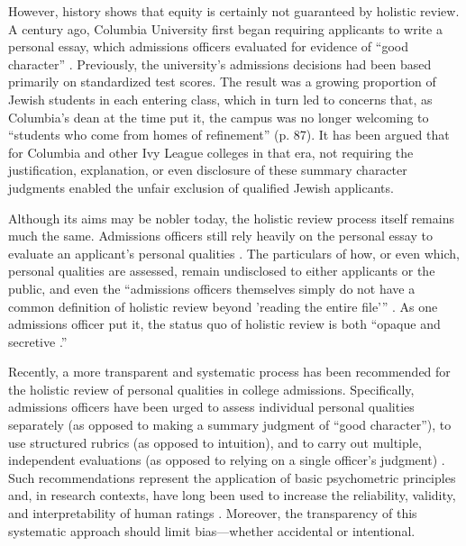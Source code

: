 \documentclass[11pt]{report}
\begin{document}
\begin{mainf}
However, history shows that equity is certainly not guaranteed by holistic review. A century ago, Columbia University first began requiring applicants to write a personal essay, which admissions officers evaluated for evidence of “good character” 
 \cite{karabel_chosen_2005}. Previously, the university’s admissions decisions had been based primarily on standardized test scores. The result was a growing proportion of Jewish students in each entering class, which in turn led to concerns that, as Columbia’s dean at the time put it, the campus was no longer welcoming to “students who come from homes of refinement” (p. 87). It has been argued that for Columbia and other Ivy League colleges in that era, not requiring the justification, explanation, or even disclosure of these summary character judgments enabled the unfair exclusion of qualified Jewish applicants.
 

Although its aims may be nobler today, the holistic review process itself remains much the same. Admissions officers still rely heavily on the personal essay to evaluate an applicant’s personal qualities \cite{national_research_council_assessing_2011}. The particulars of how, or even which, personal qualities are assessed, remain undisclosed to either applicants or the public, and even the “admissions officers themselves simply do not have a common definition of holistic review beyond 'reading the entire file'” \cite{bastedo_what_2018}. As one admissions officer put it, the status quo of holistic review is both ``opaque and secretive \cite{starkman_confessions_2013}.''

Recently, a more transparent and systematic process has been recommended for the holistic review of personal qualities in college admissions. Specifically, admissions officers have been urged to assess individual personal qualities separately (as opposed to making a summary judgment of “good character”), to use structured rubrics (as opposed to intuition), and to carry out multiple, independent evaluations (as opposed to relying on a single officer’s judgment) \cite{coleman_understanding_2018,anderson_character_2020}. Such recommendations represent the application of basic psychometric principles and, in research contexts, have long been used to increase the reliability, validity, and interpretability of human ratings \cite{kahneman_noise_2021,rushton_behavioral_1983}. Moreover, the transparency of this systematic approach should limit bias—whether accidental or intentional. 


\end{mainf}
\end{document}
